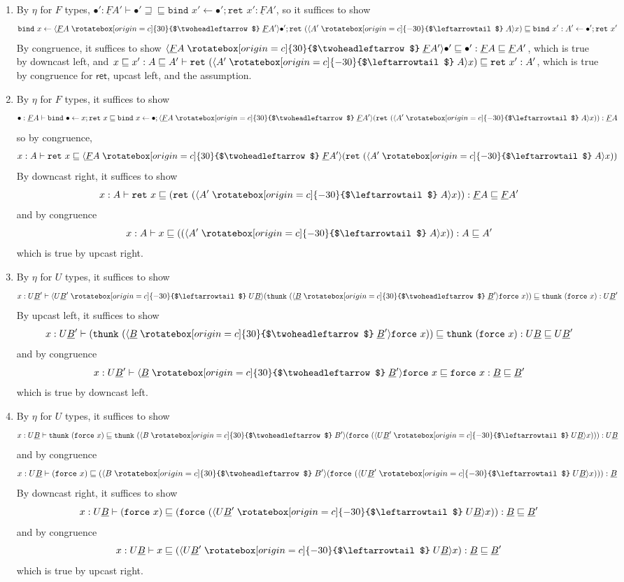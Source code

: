 \documentclass[acmsmall,nonacm]{acmart}
\renewcommand{\u}{\underline}
\newcommand{\ltdyn}{\sqsubseteq}
\newcommand{\gtdyn}{\sqsupseteq}
\newcommand{\equidyn}{\mathrel{\gtdyn\ltdyn}}
\newcommand{\uarrow}{\mathrel{\rotatebox[origin=c]{-30}{$\leftarrowtail$}}}
\newcommand{\darrow}{\mathrel{\rotatebox[origin=c]{30}{$\twoheadleftarrow$}}}
\newcommand{\upcast}[2]{\langle{#2}\uarrow{#1}\rangle}
\newcommand{\dncast}[2]{\langle{#1}\darrow{#2}\rangle}
\newcommand{\bindXtoYinZ}[2]{\kw{bind}#2 \leftarrow #1;}
\newcommand{\kw}[1]{\texttt{#1}\,\,}
\newcommand{\ret}{\kw{ret}}
\newcommand{\thunk}{\kw{thunk}}
\newcommand{\force}{\kw{force}}
\begin{document}
\begin{longproof} ~
  \begin{enumerate}
  \item By $\eta$ for $F$ types, $\bullet' : \u F A' \vdash \bullet'
    \equidyn \bindXtoYinZ{\bullet'}{x'}{\ret{x'}} : \u F A'$, so it
    suffices to show
    \[
    \bindXtoYinZ{\dncast{\u F A}{\u F A'}{\bullet'}}{x}{\ret{(\upcast{A}{A'}{x})}} \ltdyn \bindXtoYinZ{\bullet'}{x':A'}{\ret{x'}}
    \]
    By congruence, it suffices to show ${\dncast{\u F A}{\u F
        A'}{\bullet'}} \ltdyn \bullet' : \u F A \ltdyn \u F A'$, which
    is true by downcast left, and 
    $x \ltdyn x' : A \ltdyn A' \vdash {\ret{(\upcast{A}{A'}{x})}} \ltdyn
    {\ret{x'}} : A'$,
    which is true by congruence for $\mathsf{ret}$, upcast left, and the assumption.

  \item By $\eta$ for $F$ types, it suffices to show
    \[
    \bullet : \u F A \vdash \bindXtoYinZ{x}{\bullet}{\ret{x}} \ltdyn \bindXtoYinZ{\bullet}{x}{\dncast{\u F A}{\u F A'}{(\ret{(\upcast{A}{A'}{x})})}}  : \u F A
    \]
    so by congruence,
    \[
    x : A \vdash \ret{x} \ltdyn {\dncast{\u F A}{\u F A'}{(\ret{(\upcast{A}{A'}{x})})}}
    \]
    By downcast right, it suffices to show
    \[
    x : A \vdash \ret{x} \ltdyn (\ret{(\upcast{A}{A'}{x})}) : \u F A \ltdyn \u F A'
    \]
    and by congruence 
    \[
    x : A \vdash x \ltdyn ({(\upcast{A}{A'}{x})}) : A \ltdyn A'
    \]
    which is true by upcast right.  
    
  \item By $\eta$ for $U$ types, it suffices to show
    \[
    x : U \u B' \vdash {\upcast{U \u B}{U \u B'}{(\thunk{({\dncast{\u B}{\u B'}{\force x}})})}} \ltdyn \thunk{(\force{x})} : U \u B'
    \]
    By upcast left, it suffices to show
    \[
    x : U \u B' \vdash {(\thunk{({\dncast{\u B}{\u B'}{\force x}})})} \ltdyn \thunk{(\force{x})} : U \u B \ltdyn U \u B'
    \]
    and by congruence 
    \[
    x : U \u B' \vdash {\dncast{\u B}{\u B'}{\force x}} \ltdyn \force{x} : \u B \ltdyn \u B'
    \]
    which is true by downcast left.
    
  \item By $\eta$ for $U$ types, it suffices to show
    \[
    x : U \u B \vdash \thunk{(\force x)} \ltdyn \thunk{(\dncast{B}{B'}{(\force{(\upcast{U \u B}{U \u B'}{x})})})} : U \u B
    \]
    and by congruence
    \[
    x : U \u B \vdash {(\force x)} \ltdyn {(\dncast{B}{B'}{(\force{(\upcast{U \u B}{U \u B'}{x})})})} : \u B
    \]
    By downcast right, it suffices to show
    \[
    x : U \u B \vdash {(\force x)} \ltdyn {(\force{(\upcast{U \u B}{U \u B'}{x})})} : \u B \ltdyn \u B'
    \]
    and by congruence 
    \[
    x : U \u B \vdash {x} \ltdyn {(\upcast{U \u B}{U \u B'}{x})} : \u B \ltdyn \u B'
    \]
    which is true by upcast right.
  \end{enumerate}
\end{longproof}
\end{document}
